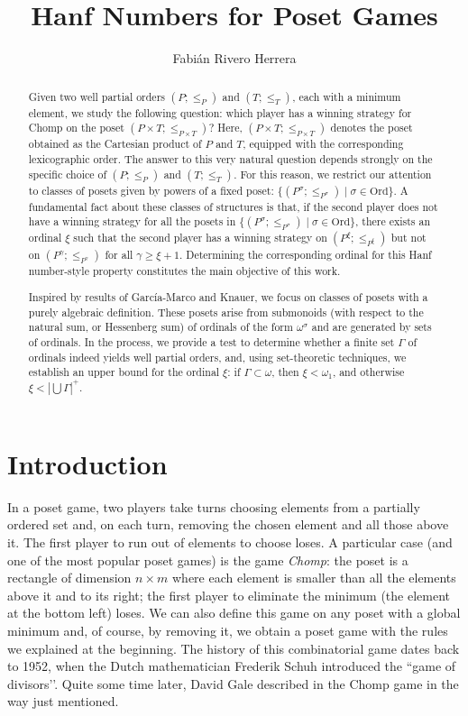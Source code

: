 \documentclass[reqno]{amsart}
\title[]{Hanf Numbers for Poset Games}
\author[]{Fabián Rivero Herrera}
\theoremstyle{definition}
\theoremstyle{definition}
\theoremstyle{plain} %
\begin{document}
\begin{abstract}
Given two well partial orders $(P;\leq_P)$ and $(T;\leq_T)$, each with a minimum element, we study the following question: which player has a winning strategy for Chomp on the poset $(P\times T;\leq_{P\times T})$? Here, $(P\times T;\leq_{P\times T})$ denotes the poset obtained as the Cartesian product of $P$ and $T$, equipped with the corresponding lexicographic order. The answer to this very natural question depends strongly on the specific choice of $(P;\leq_P)$ and $(T;\leq_T)$. For this reason, we restrict our attention to classes of posets given by powers of a fixed poset: $\{(P^\sigma;\leq_{P^\sigma})\mid \sigma\in\mathrm{Ord}\}$. A fundamental fact about these classes of structures is that, if the second player does not have a winning strategy for all the posets in $\{(P^\sigma;\leq_{P^\sigma})\mid \sigma\in\mathrm{Ord}\}$, there exists an ordinal $\xi$ such that the second player has a winning strategy on $(P^{\xi};\leq_{P^{\xi}})$ but not on $(P^{\gamma};\leq_{P^{\gamma}})$ for all $\gamma\geq\xi+1$. Determining the corresponding ordinal for this Hanf number-style property constitutes the main objective of this work.

Inspired by results of Garc\'ia-Marco and Knauer, we focus on classes of posets with a purely algebraic definition. These posets arise from submonoids (with respect to the natural sum, or Hessenberg sum) of ordinals of the form $\omega^\sigma$ and are generated by sets of ordinals. In the process, we provide a test to determine whether a finite set $\Gamma$ of ordinals indeed yields well partial orders, and, using set-theoretic techniques, we establish an upper bound for the ordinal $\xi$: if $\Gamma\subset\omega$, then $\xi<\omega_1$, and otherwise $\xi<|\bigcup\Gamma|^+$.
\end{abstract}
\maketitle
\vspace{-1cm}
\section{Introduction}
In a poset game, two players take turns choosing elements from a partially ordered set and, on each turn, removing the chosen element and all those above it. The first player to run out of elements to choose loses. A particular case (and one of the most popular poset games) is the game \textit{Chomp}: the poset is a rectangle of dimension $n\times m$ where each element is smaller than all the elements above it and to its right; the first player to eliminate the minimum (the element at the bottom left) loses. We can also define this game on any poset with a global minimum and, of course, by removing it, we obtain a poset game with the rules we explained at the beginning. The history of this combinatorial game dates back to 1952, when the Dutch mathematician Frederik Schuh introduced the ``game of divisors’’. Quite some time later, David Gale described in \cite{gale} the Chomp game in the way just mentioned.
\end{document}
